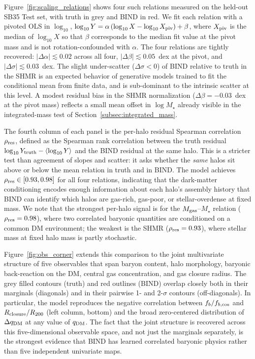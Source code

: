 \documentclass[linenumbers,trackchanges, twocolumn]{aastex701}
\begin{document}
Figure~\ref{fig:scaling_relations} shows four such relations measured on the held-out SB35 Test set, with truth in grey and \textsc{BIND} in red. We fit each relation with a pivoted OLS in $\log_{10}$, $\log_{10} Y = \alpha\,(\log_{10} X - \log_{10} X_{\rm piv}) + \beta$, where $X_{\rm piv}$ is the median of $\log_{10}X$ so that $\beta$ corresponds to the median fit value at the pivot mass and is not rotation-confounded with $\alpha$. The four relations are tightly recovered: $|\Delta\alpha|\lesssim 0.02$ across all four, $|\Delta\beta|\lesssim 0.05$~dex at the pivot, and $|\Delta\sigma|\lesssim 0.03$~dex. The slight under-scatter ($\Delta\sigma<0$) of \textsc{BIND} relative to truth in the SHMR is an expected behavior of generative models trained to fit the conditional mean from finite data, and is sub-dominant to the intrinsic scatter at this level. A modest residual bias in the SHMR normalization ($\Delta\beta=-0.03$~dex at the pivot mass) reflects a small mean offset in $\log M_\star$ already visible in the integrated-mass test of Section~\ref{subsec:integrated_mass}.

The fourth column of each panel is the per-halo residual Spearman correlation $\rho_{\rm res}$, defined as the Spearman rank correlation between the truth residual $\log_{10} Y_{\rm truth} - \langle\log_{10} Y\rangle$ and the \textsc{BIND} residual at the same halo. This is a stricter test than agreement of slopes and scatter: it asks whether the \emph{same} halos sit above or below the mean relation in truth and in \textsc{BIND}. The model achieves $\rho_{\rm res}\in[0.93, 0.98]$ for all four relations, indicating that the dark-matter conditioning encodes enough information about each halo's assembly history that \textsc{BIND} can identify which halos are gas-rich, gas-poor, or stellar-overdense at fixed mass. We note that the strongest per-halo signal is for the $M_{\rm gas}$--$M_\star$ relation ($\rho_{\rm res}=0.98$), where two correlated baryonic quantities are conditioned on a common DM environment; the weakest is the SHMR ($\rho_{\rm res}=0.93$), where stellar mass at fixed halo mass is partly stochastic.

Figure~\ref{fig:obs_corner} extends this comparison to the joint multivariate structure of five observables that span baryon content, halo morphology, baryonic back-reaction on the DM, central gas concentration, and gas closure radius. The grey filled contours (truth) and red outlines (\textsc{BIND}) overlap closely both in their marginals (diagonals) and in their pairwise 1- and 2-$\sigma$ contours (off-diagonals). In particular, the model reproduces the negative correlation between $f_b/f_{b,{\rm cos}}$ and $R_{\rm closure}/R_{200}$ (left column, bottom) and the broad zero-centered distribution of $\Delta q_{\rm DM}$ at any value of $q_{\rm DM}$. The fact that the joint structure is recovered across this five-dimensional observable space, and not just the marginals separately, is the strongest evidence that \textsc{BIND} has learned correlated baryonic physics rather than five independent univariate maps.
\end{document}
